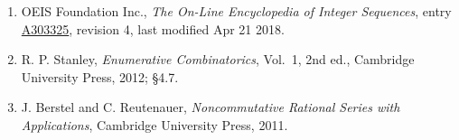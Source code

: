 \documentclass[11pt]{article}
\theoremstyle{definition}
\begin{document}
\begin{enumerate}

\item OEIS Foundation Inc., \emph{The On-Line Encyclopedia of Integer Sequences}, entry \href{https://oeis.org/A303325}{A303325}, revision 4, last modified Apr 21 2018.

\item R. P. Stanley, \emph{Enumerative Combinatorics}, Vol.~1, 2nd ed., Cambridge University Press, 2012; \S4.7.

\item J. Berstel and C. Reutenauer, \emph{Noncommutative Rational Series with Applications}, Cambridge University Press, 2011.

\end{enumerate}
\end{document}
